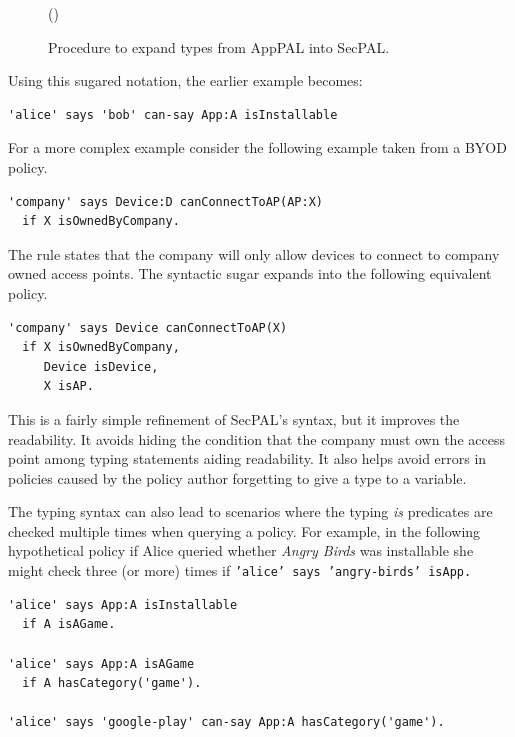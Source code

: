 \documentclass[thesis.tex]{subfiles}
\begin{document}
\begin{figure}\small\sffamily\centering
{}
\begin{algorithm}[H]
  \Fn(){}{
    \;
  }
\end{algorithm}
  \caption{Procedure to expand types from AppPAL into SecPAL.}
  \label{lst:type-expansion-alg}
\end{figure}

Using this sugared notation, the earlier example becomes:
\begin{lstlisting}
'alice' says 'bob' can-say App:A isInstallable
\end{lstlisting}

\noindent\begin{minipage}{\textwidth}
For a more complex example consider the following example taken from a
BYOD policy.
\begin{lstlisting}
'company' says Device:D canConnectToAP(AP:X)
  if X isOwnedByCompany.
\end{lstlisting}
\end{minipage}

The rule states that the company will only allow devices to connect to
company owned access points.  The syntactic sugar expands into the
following equivalent policy.

\begin{lstlisting}
'company' says Device canConnectToAP(X)
  if X isOwnedByCompany,
     Device isDevice,
     X isAP.
\end{lstlisting}

This is a fairly simple refinement of SecPAL's syntax, but it improves the
readability. It avoids hiding the condition that the company must own the access
point among typing statements aiding readability. It also helps avoid errors
in policies caused by the policy author forgetting to give a type to a variable.

The typing syntax can also lead to scenarios where the typing \emph{is} predicates are checked multiple times when querying a policy.  For example, in the following hypothetical policy if Alice queried whether \emph{Angry Birds} was installable she might check three (or more) times if \texttt{'alice' says 'angry-birds' isApp.}
\begin{lstlisting}
'alice' says App:A isInstallable
  if A isAGame.

'alice' says App:A isAGame
  if A hasCategory('game').

'alice' says 'google-play' can-say App:A hasCategory('game').
\end{lstlisting}
\end{document}
